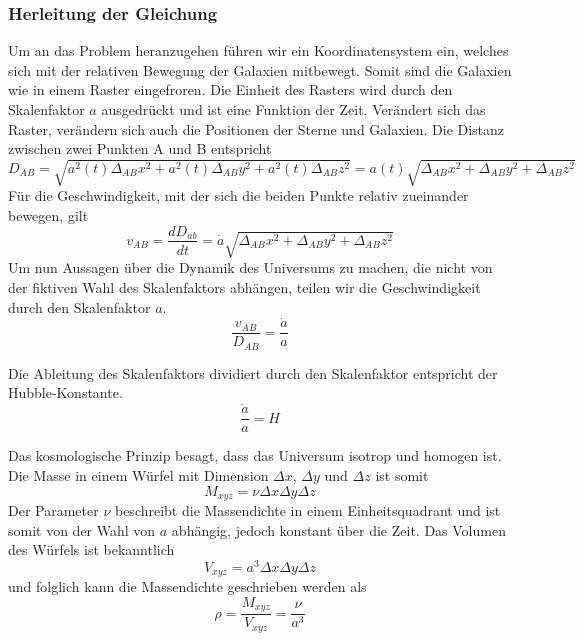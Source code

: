 \begin{refsection}
\subsubsection{Herleitung der Gleichung}
Um an das Problem heranzugehen führen wir ein Koordinatensystem ein, welches sich mit der relativen Bewegung der Galaxien mitbewegt. Somit sind die Galaxien wie in einem Raster eingefroren. Die Einheit des Rasters wird durch den Skalenfaktor $a$ ausgedrückt und ist eine Funktion der Zeit. Verändert sich das Raster, verändern sich auch die Positionen der Sterne und Galaxien.
Die Distanz zwischen zwei Punkten A und B entspricht 
\begin{equation}
D_{AB} = \sqrt{a^2(t)\Delta_{AB}x^2 + a^2(t)\Delta_{AB}y^2 + a^2(t)\Delta_{AB}z^2} = a(t) \sqrt{\Delta_{AB}x^2 + \Delta_{AB}y^2 + \Delta_{AB}z^2}
\end{equation}
F\"{u}r die Geschwindigkeit, mit der sich die beiden Punkte relativ zueinander bewegen, gilt 
\begin{equation}
v_{AB} = \dfrac{dD_{ab}}{dt} 
	   = \dot{a} \sqrt{\Delta_{AB}x^2 + \Delta_{AB}y^2 + \Delta_{AB}z^2}
\end{equation}
Um nun Aussagen über die Dynamik des Universums zu machen, die nicht von der fiktiven Wahl  des Skalenfaktors abhängen, teilen wir die Geschwindigkeit durch den Skalenfaktor $a$.
\begin{equation}
\frac{v_{AB} }{D_{AB}} = \frac{\dot{a}}{a}
\label{friedmann:geschwindigkeit}
\end{equation}
\begin{satz} 
	Die Ableitung des Skalenfaktors dividiert durch den Skalenfaktor entspricht der Hubble-Konstante.
	\[
	\frac{\dot{a}}{a} = H
	\]
\end{satz}
Das kosmologische Prinzip besagt, dass das Universum isotrop und homogen ist. Die Masse in einem Würfel mit Dimension $\Delta x$, $\Delta y$ und $\Delta z$ ist somit
\begin{equation}
M_{xyz} = \nu \Delta x \Delta y \Delta z
\end{equation}
Der Parameter $\nu$ beschreibt die Massendichte in einem Einheitsquadrant und ist somit von der Wahl von $a$ abhängig, jedoch konstant über die Zeit. Das Volumen des Würfels ist bekanntlich 
\begin{equation}
V_{xyz} = a^3 \Delta x \Delta y \Delta z
\end{equation}
und folglich kann die Massendichte geschrieben werden als
\begin{equation}
\rho = \frac{M_{xyz}}{V_{xyz}} = \frac{\nu}{a^3}
\label{friedmann:dichte}
\end{equation}

\end{refsection}
